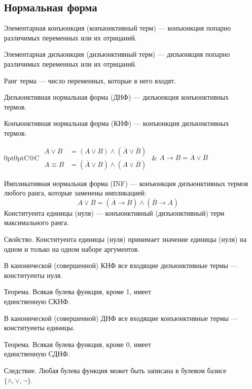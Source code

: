 \subsection{Нормальная форма}

{\bold Элементарная конъюнкция} {\ital (конъюнктивный терм)} --- конъюнкция попарно различимых переменных или их отрицаний.

{\bold Элементарная дизъюнкция} {\ital (дизъюнктивный терм)} --- дизъюнкция попарно различимых переменных или их отрицаний.

{\bold Ранг терма} --- число переменных, которые в него входят.

{\bold Дизъюнктивная нормальная форма} {\ital (ДНФ)} --- дизъюнкция конъюнктивных термов.

{\bold Конъюнктивная нормальная форма} {\ital (КНФ)} --- конъюнкция дизъюнктивных термов:
\begin{theorem}
\begin{tabularcx}{0pt}{0pt}{C@{\hspace*{-16pt}}C}{\textwidth}
$\begin{aligned}
A\dot{\lor}B&=(A\lor B)\land(\overline{A}\lor\overline{B})\\
A\equiv B&=(\overline{A}\lor B)\land(A\lor\overline{B})
\end{aligned}$\hspace*{-18pt} & $A\rightarrow B=\overline{A}\lor B$
\end{tabularcx}
\end{theorem}
{\bold Импликативная нормальная форма} {\ital (INF)} --- конъюнкция дизъюнктивных термов любого ранга, которые заменены импликацией:
$$A\lor B=(\overline{A}\rightarrow B)\land(\overline{B}\to A)$$
{\bold Конституента единицы} {\ital (нуля)} --- конъюнктивный {\ital (дизъюнктивный)} терм максимального ранга.

\begin{theorem}
{\bold Свойство.} Конституента единицы {\ital (нуля)} принимает значение единицы {\ital (нуля)} на одном и только на одном наборе аргументов.
\end{theorem}

В {\bold канонической {\ital (совершенной)} КНФ} все входящие дизъюнктивные термы --- конституенты нуля.

\begin{theorem}
{\bold Теорема.} Всякая булева функция, кроме 1, имеет\\ единственную СКНФ.
\end{theorem}

В {\bold канонической {\ital (совершенной)} ДНФ} все входящие конъюнктивные термы --- конституенты единицы.

\begin{theorem}
{\bold Теорема.} Всякая булева функция, кроме 0, имеет\\ единственную СДНФ.
\end{theorem}

\begin{theorem}
{\bold Следствие.} Любая булева функция может быть записана в {\ital булевом базисе} $\{\land,\lor,\neg\}$.
\end{theorem}
